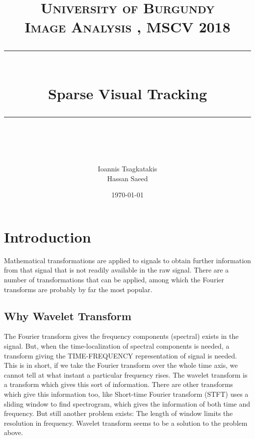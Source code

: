\documentclass[a4paper,12pt]{article}
\title{
\normalfont \normalsize 
\textsc{University of Burgundy \\ 
Image Analysis
, MSCV 2018} \\
[10pt] 
\rule{\linewidth}{0.5pt} \\[6pt] 
\huge Sparse Visual Tracking \\
\rule{\linewidth}{2pt}  \\[10pt]
}
\author{Ioannis Tsagkatakis \\ Hassan Saeed}
\date{\normalsize \today}
\begin{document}
\maketitle
\noindent


\section{Introduction}
Mathematical transformations are applied to signals to obtain further information from that signal that is not readily available in the raw signal. There are a number of transformations that can be applied, among which the Fourier transforms are probably by far the most popular.

\subsection{Why Wavelet Transform }
The Fourier transform gives the frequency components (spectral) exists in the signal. But, when the time-localization of spectral components is needed, a transform giving the TIME-FREQUENCY representation of signal is needed. This is in short, if we take the Fourier transform over the whole time axis, we cannot tell at what instant a particular frequency rises. The wavelet transform is a transform which gives this sort of information. There are other transforms which give this information too, like Short-time Fourier transform (STFT) uses a sliding window to find spectrogram, which gives the information of both time and frequency. But still another problem exists: The length of window limits the resolution in frequency. Wavelet transform seems to be a solution to the problem above.
\end{document}
